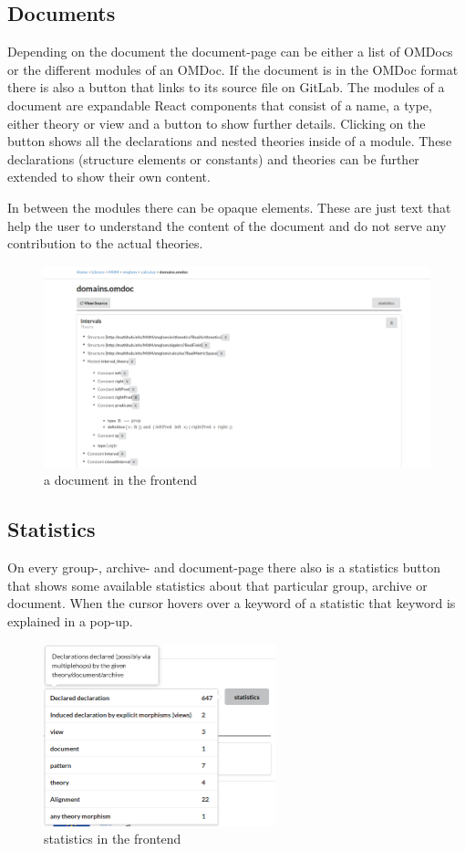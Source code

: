 \documentclass[11pt,a4paper]{article}
\begin{document}
\subsection{Documents}
Depending on the document the document-page can be either a list of OMDocs or the different modules of an OMDoc. 
If the document is in the OMDoc format there is also a button that links to its source file on GitLab. 
The modules of a document are expandable React components that consist of a name, a type, either theory or view and a button to show further details.
Clicking on the button shows all the declarations and nested theories inside of a module.
These declarations (structure elements or constants) and theories can be further extended to show their own content. 

In between the modules there can be opaque elements.
These are just text that help the user to understand the content of the document and do not serve any contribution to the actual theories. 
\begin{figure}[H]
\includegraphics[width=1\textwidth]{document.png}
\caption{a document in the frontend}
\end{figure}

\subsection{Statistics}
On every group-, archive- and document-page there also is a statistics button that shows some available statistics about that particular group, archive or document.
When the cursor hovers over a keyword of a statistic that keyword is explained in a pop-up. 
\begin{figure}[H]
\centerline{\includegraphics[width=0.6\textwidth]{statistics.png}}
\caption{statistics in the frontend}
\end{figure}
\end{document}
